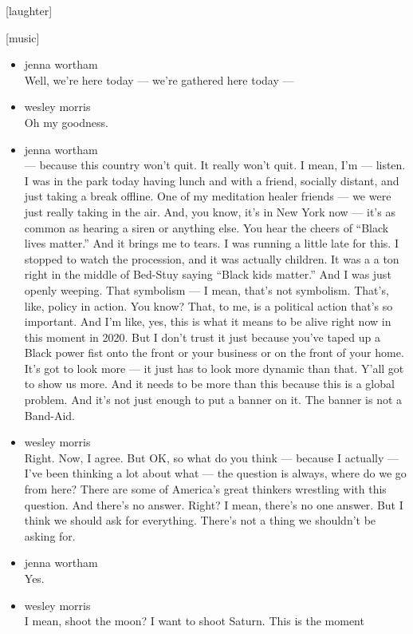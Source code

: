 {[}laughter{]}

{[}music{]}

\begin{itemize}
\item
  jenna wortham\\
  Well, we're here today --- we're gathered here today ---
\item
  wesley morris\\
  Oh my goodness.
\item
  jenna wortham\\
  --- because this country won't quit. It really won't quit. I mean, I'm
  --- listen. I was in the park today having lunch and with a friend,
  socially distant, and just taking a break offline. One of my
  meditation healer friends --- we were just really taking in the air.
  And, you know, it's in New York now --- it's as common as hearing a
  siren or anything else. You hear the cheers of ``Black lives matter.''
  And it brings me to tears. I was running a little late for this. I
  stopped to watch the procession, and it was actually children. It was
  a a ton right in the middle of Bed-Stuy saying ``Black kids matter.''
  And I was just openly weeping. That symbolism --- I mean, that's not
  symbolism. That's, like, policy in action. You know? That, to me, is a
  political action that's so important. And I'm like, yes, this is what
  it means to be alive right now in this moment in 2020. But I don't
  trust it just because you've taped up a Black power fist onto the
  front or your business or on the front of your home. It's got to look
  more --- it just has to look more dynamic than that. Y'all got to show
  us more. And it needs to be more than this because this is a global
  problem. And it's not just enough to put a banner on it. The banner is
  not a Band-Aid.
\item
  wesley morris\\
  Right. Now, I agree. But OK, so what do you think --- because I
  actually --- I've been thinking a lot about what --- the question is
  always, where do we go from here? There are some of America's great
  thinkers wrestling with this question. And there's no answer. Right? I
  mean, there's no one answer. But I think we should ask for everything.
  There's not a thing we shouldn't be asking for.
\item
  jenna wortham\\
  Yes.
\item
  wesley morris\\
  I mean, shoot the moon? I want to shoot Saturn. This is the moment

\end{itemize}
